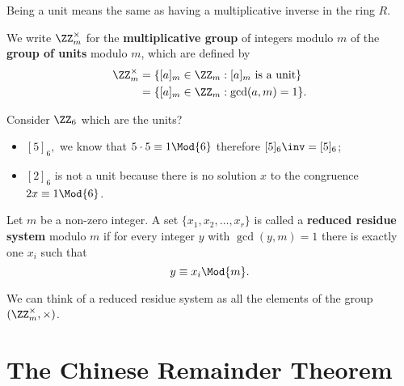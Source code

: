 \documentclass[12pt, a4paper]{article}
\begin{document}
\begin{mdnote}
    Being a unit means the same as having a multiplicative inverse in the ring \(R\).
\end{mdnote}

\begin{definition}
    We write \(\ZZ_m^{\times}\) for the \textbf{multiplicative group} of integers modulo \(m\) of the \textbf{group of units} modulo \(m\), which are defined by 
    \[\begin{aligned}
        \ZZ_m^{\times} &= \{[a]_m \in \ZZ_m :[a]_m \text{ is a unit}\} \\
                        &=\{[a]_m \in \ZZ_m : \gcd(a,m)=1\}.
    \end{aligned}\]
\end{definition}

\begin{example}
    Consider \(\ZZ_6\) which are the units?
    \begin{itemize}
        \item \([5]_6,\) we know that \(5\cdot 5 \equiv 1 \Mod{6}\)  therefore \([5]_6\inv = [5]_6\);
        \item \([2]_6\) is not a unit because there is no solution \(x\) to the congruence \(2x \equiv 1\Mod{6}\).
    \end{itemize}
\end{example}

\begin{definition}
    Let \(m\) be a non-zero integer. A set \(\{x_1,x_2,\ldots,x_r\}\) is called a \textbf{reduced residue system} modulo \(m\) if for every integer \(y\) with \(\gcd(y,m)=1\) there is exactly one \(x_i\) such that \[y\equiv x_i \Mod{m}.\]
\end{definition}

\begin{mdnote}
    We can think of a reduced residue system as all the elements of the group \((\ZZ_m^{\times}, \times )\).
\end{mdnote}

\section{The Chinese Remainder Theorem}

\end{document}
